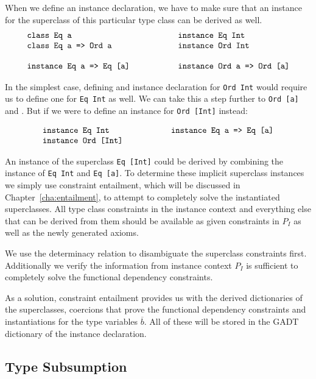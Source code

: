 When we define an instance declaration, we have to make sure that an instance
for the superclass of this particular type class can be derived as well.
\[
\begin{array}{l@{\hspace{2cm}}l}
    \texttt{class Eq a} &\texttt{instance Eq Int}
    \\
    \texttt{class Eq a => Ord a} &\texttt{instance Ord Int}
    \\
    \\
    \texttt{instance Eq a => Eq [a]} &\texttt{instance Ord a => Ord [a]}
\end{array}
\]

In the simplest case, defining and instance declaration for \texttt{Ord Int}
would require us to define one for \texttt{Eq Int} as well. We can take this a
step further to \texttt{Ord [a]} and . But if we were to define an
instance for \texttt{Ord [Int]} instead:

\[
\begin{array}{l@{\hspace{2cm}}l}
    \texttt{instance Eq Int} &\texttt{instance Eq a => Eq [a]}
    \\
    \texttt{instance Ord [Int]}
\end{array}
\]

An instance of the superclass \texttt{Eq [Int]} could be derived by combining
the instance of \texttt{Eq Int} and \texttt{Eq [a]}. To determine these implicit
superclass instances we simply use constraint entailment, which will be
discussed in Chapter~\ref{cha:entailment}, to attempt to completely solve the
instantiated superclasses. All type class constraints in the instance context
and everything else that can be derived from them should be available as given
constraints in $P_I$ as well as the newly generated axioms.

We use the determinacy relation to disambiguate the superclass constraints
first. Additionally we verify the information from instance context $P_I$ is
sufficient to completely solve the functional dependency constraints.

As a solution, constraint entailment provides us with the derived dictionaries
of the superclasses, coercions that prove the functional dependency constraints
and instantiations for the type variables $\overline{b}$. All of these will be
stored in the GADT dictionary of the instance declaration.

\subsection{Type Subsumption}
\label{sec:subsumption}

